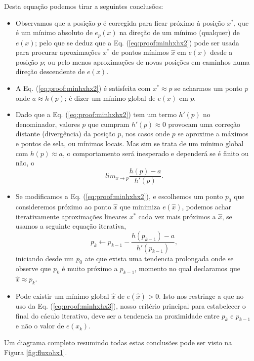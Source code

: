\begin{myproofT}
Desta equação podemos tirar a seguintes conclusões:
\begin{itemize}

\item Observamos que a posição $p$ é corregida para ficar próximo à posição $x^*$, 
que é um mínimo absoluto de $e_p(x)$ na direção de um mínimo (qualquer) de $e(x)$;
pelo que se deduz que a Eq. (\ref{eq:proof:minhxhx2})
pode ser usada para procurar aproximações $x^*$ de pontos mínimos $\hat{x}$ em $e(x)$ desde a posição $p$;
ou pelo menos aproximações de novas posições em caminhos numa direção descendente de $e(x)$.

\item A Eq. (\ref{eq:proof:minhxhx2}) é satisfeita 
com $x^* \approx p$ se acharmos um  
ponto $p$ onde  $a \approx h(p)$; 
é dizer um mínimo global de $e(x)$ em $p$.%

\item Dado que a Eq. (\ref{eq:proof:minhxhx2}) tem um termo $h'(p)$ no denominador,
valores $p$ que cumpram $h'(p)\approx 0$ provocam uma correção distante (divergência) da posição $p$,
nos casos onde $p$ se aproxime a máximos e pontos de sela,
ou mínimos locais. 
Mas sim se trata de um mínimo global com $h(p)\approx a$, 
o comportamento será inesperado e dependerá se é finito ou não, o
\begin{equation}
lim_{x\rightarrow p } \frac{h(p)-a}{h'(p)}.
\end{equation}

\item Se modificamos a Eq. (\ref{eq:proof:minhxhx2}), e escolhemos um ponto  
$p_0$ que consideremos próximo ao ponto $\hat{x}$ que minimiza $e(\hat{x})$,
podemos achar iterativamente aproximações lineares $x^*$ cada vez mais próximos a  $\hat{x}$,
se usamos a seguinte equação iterativa,
\begin{equation}\label{eq:proof:minhxhx3}
p_{k} \leftarrow p_{k-1} - \frac{ h(p_{k-1})-a}{h'(p_{k-1})},
\end{equation}
iniciando desde um $p_{0}$ 
ate que exista uma tendencia prolongada onde se observe que $p_{k}$ é muito próximo a $p_{k-1}$,
momento no qual declaramos que $\hat{x} \approx p_{k}$.
\item Pode existir um mínimo global $\hat{x}$ de $e(\hat{x})>0$.
Isto nos restringe a que no uso da Eq. (\ref{eq:proof:minhxhx3}),
nosso critério principal para estabelecer o final do cáculo iterativo,
deve ser a tendencia na  proximidade entre $p_{k}$ e $p_{k-1}$ 
e não o valor de $e(x_k)$.
\end{itemize}

Um diagrama completo resumindo todas estas conclusões pode ser visto na Figura \ref{fig:fluxohx1}.
\end{myproofT}



